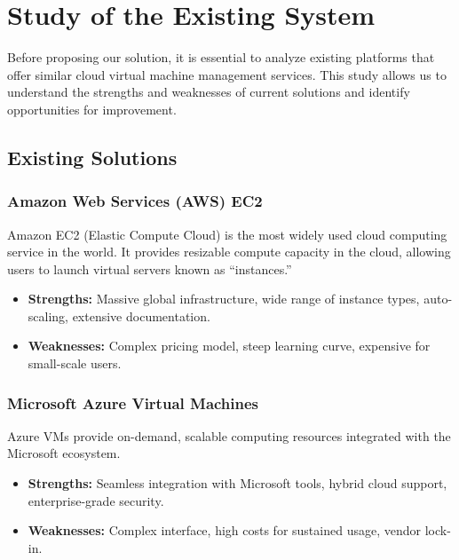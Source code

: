 \section{Study of the Existing System}

Before proposing our solution, it is essential to analyze existing platforms that offer similar cloud virtual machine management services. This study allows us to understand the strengths and weaknesses of current solutions and identify opportunities for improvement.

\subsection{Existing Solutions}

\subsubsection{Amazon Web Services (AWS) EC2}

Amazon EC2 (Elastic Compute Cloud) is the most widely used cloud computing service in the world. It provides resizable compute capacity in the cloud, allowing users to launch virtual servers known as ``instances.''

\begin{itemize}
  \item \textbf{Strengths:} Massive global infrastructure, wide range of instance types, auto-scaling, extensive documentation.
  \item \textbf{Weaknesses:} Complex pricing model, steep learning curve, expensive for small-scale users.
\end{itemize}

\subsubsection{Microsoft Azure Virtual Machines}

Azure VMs provide on-demand, scalable computing resources integrated with the Microsoft ecosystem.

\begin{itemize}
  \item \textbf{Strengths:} Seamless integration with Microsoft tools, hybrid cloud support, enterprise-grade security.
  \item \textbf{Weaknesses:} Complex interface, high costs for sustained usage, vendor lock-in.
\end{itemize}

